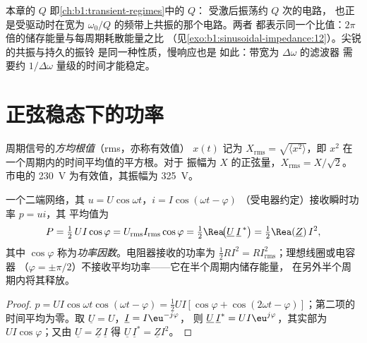 \begin{remark}[再论 $Q$]\label{rem:b1:sinusoidal-impedance:Q}
本章的 $Q$ 即\cref{ch:b1:transient-regimes}中的 $Q$：
受激后振荡约 $Q$ 次的电路，
也正是受驱动时在宽为 $\omega_0/Q$ 的频带上共振的那个电路。两者
都表示同一个比值：$2\pi$ 倍的储存能量与每周期耗散能量之比
（见\cref{exo:b1:sinusoidal-impedance:12}）。尖锐的共振与持久的振铃
是同一种性质，慢响应也是
如此：带宽为 $\Delta\omega$ 的滤波器
需要约 $1/\Delta\omega$ 量级的时间才能稳定。
\end{remark}

\section{正弦稳态下的功率}

\begin{definition}[有效值]\label{def:b1:sinusoidal-impedance:rms}
周期信号的\emph{方均根值}（rms，亦称有效值）
$x(t)$ 记为 $X_{\mathrm{rms}} = \sqrt{\langle x^2\rangle}$，即
$x^2$ 在一个周期内的时间平均值的平方根。对于
振幅为 $X$ 的正弦量，$X_{\mathrm{rms}} = X/\sqrt2$。市电的 \qty{230}{V}
为有效值，其振幅为 \qty{325}{V}。
\end{definition}

\begin{theorem}[平均功率]\label{thm:b1:sinusoidal-impedance:power}
一个二端网络，其 $u = U\cos\omega t$，$i = I\cos(\omega t - \varphi)$
（受电器约定）接收瞬时功率 $p = ui$，其
平均值为
\[
P = \tfrac12\,UI\cos\varphi = U_{\mathrm{rms}}I_{\mathrm{rms}}\cos\varphi
= \tfrac12\Rea\!\big(\underline U\,\underline I^{\,*}\big) = \tfrac12\Rea(\underline Z)\,I^2,
\]
其中 $\cos\varphi$ 称为\emph{功率因数}。电阻器接收的功率为
$\tfrac12 RI^2 = RI_{\mathrm{rms}}^2$；理想线圈或电容器
（$\varphi = \pm\pi/2$）不接收平均功率——它在半个周期内储存能量，
在另外半个周期内将其释放。
\end{theorem}

\begin{proof}
$p = UI\cos\omega t\cos(\omega t - \varphi) = \tfrac12 UI[\cos\varphi +
\cos(2\omega t - \varphi)]$；第二项的时间平均为零。取
$\underline U = U$，$\underline I = I\eu^{-j\varphi}$，
则 $\underline U\,\underline I^* = UI\eu^{j\varphi}$，其实部为
$UI\cos\varphi$；又由 $\underline U = \underline Z\,\underline I$ 得
$\underline U\,\underline I^* = \underline Z I^2$。
\end{proof}


